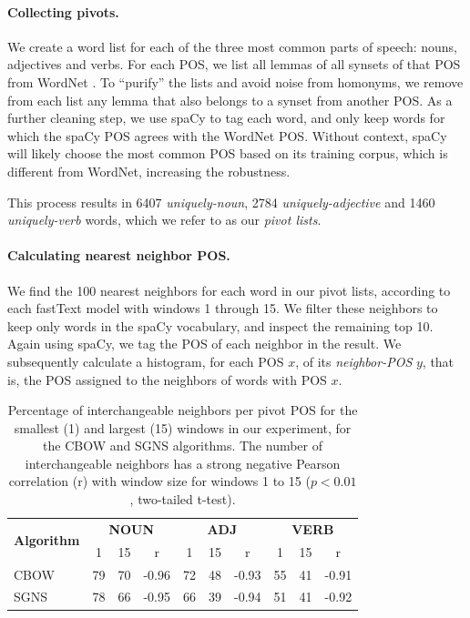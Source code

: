 \documentclass[11pt,a4paper]{article}
\begin{document}
    \paragraph{Collecting pivots.}
    
    We create a word list for each of the three most
    common parts of speech:
    nouns, adjectives and verbs.
    For each POS, we list all lemmas of all synsets of that POS from
    WordNet \cite{miller1998wordnet}.
    To ``purify'' the lists and avoid noise from homonyms,
    we remove from each list any lemma that also belongs to a synset from
    another POS.
    As a further cleaning step, we use spaCy to tag each word,
    and only keep words for which the spaCy POS agrees with the WordNet POS.
    Without context, spaCy will likely choose the most
    common POS based on its training corpus, which is different from WordNet,
    increasing the robustness.
    
    This process results in 6407 \textit{uniquely-noun}, 2784 \textit{uniquely-adjective}
    and 1460 \textit{uniquely-verb} words, which we refer to as our \textit{pivot lists}.
    
    \paragraph{Calculating nearest neighbor POS.}
    
    We find the 100 nearest neighbors for each word in our pivot lists,
    according to each fastText model with windows 1 through 15.
    We filter these neighbors to
    keep only words in the spaCy vocabulary, and inspect the remaining top 10.
    Again using spaCy, we tag the POS of each neighbor in the result.
    We subsequently calculate a histogram, for each POS $x$, of its
    \textit{neighbor-POS} $y$, that is, the POS assigned to the neighbors of
    words with POS $x$.
    
    \begin{table}[t]
    \centering
    \small
    \setlength\tabcolsep{3.5pt}
    \def\arraystretch{1.125}
    \begin{tabular}{l|ccc|ccc|ccc}
    \multirow{2}{1cm}{\normalsize \bf Algorithm}
    & \multicolumn{3}{c|}{\normalsize \bf NOUN} & \multicolumn{3}{c|}{\normalsize \bf ADJ} & \multicolumn{3}{c}{\normalsize \bf VERB} \\
    & \normalsize 1 & \normalsize 15 & \normalsize r & \normalsize 1 & \normalsize 15 & \normalsize r & \normalsize 1 & \normalsize 15 & \normalsize r \\
    \hline
    \normalsize CBOW & 79 & 70 & -0.96 & 72 & 48 & -0.93 & 55 & 41 & -0.91 \\
    \normalsize SGNS & 78 & 66 & -0.95 & 66 & 39 & -0.94 & 51 & 41 & -0.92 
    \end{tabular}
    \caption{Percentage of interchangeable neighbors per pivot POS for the smallest (1) and largest (15)
        windows in our experiment, for the CBOW and SGNS algorithms.
        The number of interchangeable neighbors has a strong negative Pearson correlation (r) with window size
        for windows 1 to 15 ($p<0.01$, two-tailed t-test).
    \label{tab:nn_pos_hist}}
    \end{table}
    
\end{document}
